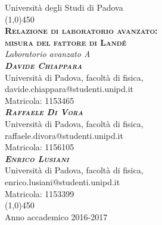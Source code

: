 
\begin{titlepage}

\begin{center}
\LARGE{Università degli Studi di Padova}\\
\line(1,0){450}\\
\vspace{1em}
\Huge{\textsc{\textbf{Relazione di laboratorio avanzato:\\ misura del fattore di Land\'e}}}\\
\vspace{2em}
\LARGE{\textit{Laboratorio avanzato A}}\\
\vspace{4em}
\huge{\textbf\textsc\textit{{{Davide Chiappara}}}}\\
\vspace{0.5em}
\normalsize{Università di Padova, facoltà di fisica,}\\
\normalsize{davide.chiappara@studenti.unipd.it}\\
\normalsize{Matricola: 1153465}\\
\vspace{1em}
\huge{\textbf\textsc\textit{{{Raffaele Di Vora}}}}\\
\vspace{0.5em}
\normalsize{Università di Padova, facoltà di fisica,}\\
\normalsize{raffaele.divora@studenti.unipd.it}\\
\normalsize{Matricola: 1156105}\\
\vspace{1em}
\huge{\textbf\textsc\textit{{{Enrico Lusiani}}}}\\
\vspace{0.5em}
\normalsize{Università di Padova, facoltà di fisica,}\\
\normalsize{enrico.lusiani@studenti.unipd.it}\\
\normalsize{Matricola: 1153399}\\
\vfill
\line(1,0){450}\\
\LARGE{Anno accademico 2016-2017}
\end{center}

\end{titlepage}

